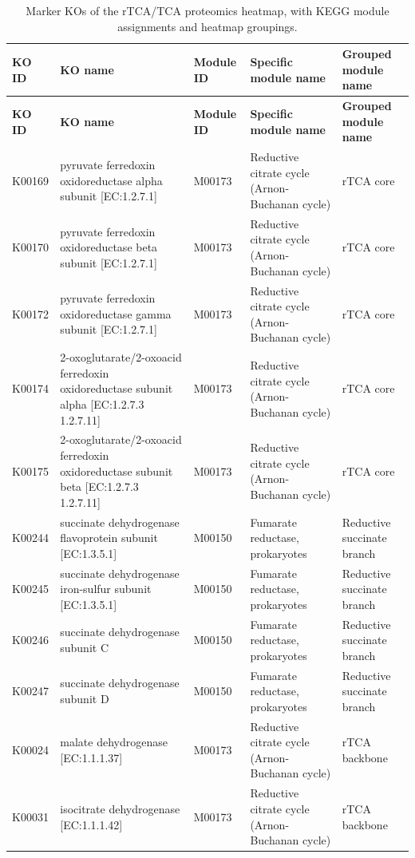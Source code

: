{\small
\begin{longtable}{|l|p{4.8cm}|l|p{4.2cm}|p{2.6cm}|}
\caption{Marker KOs of the rTCA/TCA proteomics heatmap, with KEGG module assignments and heatmap groupings.}\label{table:rtca_ko}\\
\hline
\textbf{KO ID} & \textbf{KO name} & \textbf{Module ID} & \textbf{Specific module name} & \textbf{Grouped module name} \\ \hline
\endfirsthead
\hline
\textbf{KO ID} & \textbf{KO name} & \textbf{Module ID} & \textbf{Specific module name} & \textbf{Grouped module name} \\ \hline
\endhead
K00169 & pyruvate ferredoxin oxidoreductase alpha subunit [EC:1.2.7.1] & M00173 & Reductive citrate cycle (Arnon-Buchanan cycle) & rTCA core \\ \hline
K00170 & pyruvate ferredoxin oxidoreductase beta subunit [EC:1.2.7.1] & M00173 & Reductive citrate cycle (Arnon-Buchanan cycle) & rTCA core \\ \hline
K00172 & pyruvate ferredoxin oxidoreductase gamma subunit [EC:1.2.7.1] & M00173 & Reductive citrate cycle (Arnon-Buchanan cycle) & rTCA core \\ \hline
K00174 & 2-oxoglutarate/2-oxoacid ferredoxin oxidoreductase subunit alpha [EC:1.2.7.3 1.2.7.11] & M00173 & Reductive citrate cycle (Arnon-Buchanan cycle) & rTCA core \\ \hline
K00175 & 2-oxoglutarate/2-oxoacid ferredoxin oxidoreductase subunit beta [EC:1.2.7.3 1.2.7.11] & M00173 & Reductive citrate cycle (Arnon-Buchanan cycle) & rTCA core \\ \hline
K00244 & succinate dehydrogenase flavoprotein subunit [EC:1.3.5.1] & M00150 & Fumarate reductase, prokaryotes & Reductive succinate branch \\ \hline
K00245 & succinate dehydrogenase iron-sulfur subunit [EC:1.3.5.1] & M00150 & Fumarate reductase, prokaryotes & Reductive succinate branch \\ \hline
K00246 & succinate dehydrogenase subunit C & M00150 & Fumarate reductase, prokaryotes & Reductive succinate branch \\ \hline
K00247 & succinate dehydrogenase subunit D & M00150 & Fumarate reductase, prokaryotes & Reductive succinate branch \\ \hline
K00024 & malate dehydrogenase [EC:1.1.1.37] & M00173 & Reductive citrate cycle (Arnon-Buchanan cycle) & rTCA backbone \\ \hline
K00031 & isocitrate dehydrogenase [EC:1.1.1.42] & M00173 & Reductive citrate cycle (Arnon-Buchanan cycle) & rTCA backbone \\ \hline

\end{longtable}}
